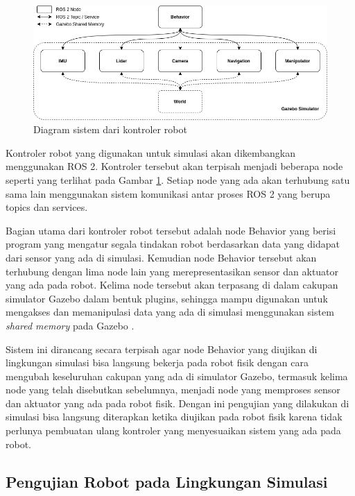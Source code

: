 \begin{figure} [ht] \centering
	\includegraphics[scale=0.45]{gambar/robot-controller.png}
	\caption{Diagram sistem dari kontroler robot}
	\label{fig:RobotController}
\end{figure}

Kontroler robot yang digunakan untuk simulasi akan dikembangkan menggunakan ROS 2.
Kontroler tersebut akan terpisah menjadi beberapa node seperti yang terlihat pada Gambar \ref{fig:RobotController}.
Setiap node yang ada akan terhubung satu sama lain menggunakan sistem komunikasi antar proses ROS 2 yang berupa topics dan services.

Bagian utama dari kontroler robot tersebut adalah node Behavior yang berisi program yang mengatur segala tindakan robot berdasarkan data yang didapat dari sensor yang ada di simulasi.
Kemudian node Behavior tersebut akan terhubung dengan lima node lain yang merepresentasikan sensor dan aktuator yang ada pada robot.
Kelima node tersebut akan terpasang di dalam cakupan simulator Gazebo dalam bentuk plugins, sehingga mampu digunakan untuk mengakses dan memanipulasi data yang ada di simulasi menggunakan sistem \emph{shared memory} pada Gazebo \citep{GazeboPlugins}.

Sistem ini dirancang secara terpisah agar node Behavior yang diujikan di lingkungan simulasi bisa langsung bekerja pada robot fisik dengan cara mengubah keseluruhan cakupan yang ada di simulator Gazebo, termasuk kelima node yang telah disebutkan sebelumnya, menjadi node yang memproses sensor dan aktuator yang ada pada robot fisik.
Dengan ini pengujian yang dilakukan di simulasi bisa langsung diterapkan ketika diujikan pada robot fisik karena tidak perlunya pembuatan ulang kontroler yang menyesuaikan sistem yang ada pada robot.

\subsection{Pengujian Robot pada Lingkungan Simulasi}

